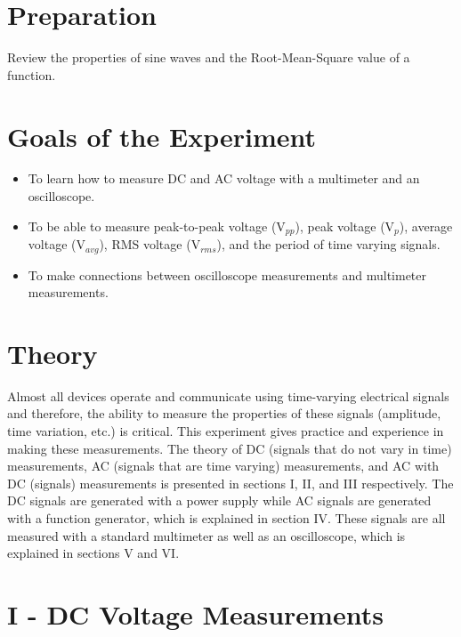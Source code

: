 \section{{\bf Preparation}}
Review the properties of sine waves and the Root-Mean-Square value of a function.

\section{{\bf Goals of the Experiment}}
\begin{itemize}
    \item To learn how to measure DC and AC voltage with a multimeter and an oscilloscope.
    \item To be able to measure peak-to-peak voltage (V$_{pp}$), peak voltage (V$_p$), average voltage (V$_{avg}$), RMS voltage (V$_{rms}$), and the period of time varying signals.
    \item To make connections between oscilloscope measurements and multimeter measurements.
\end{itemize}

\section{{\bf Theory}}
Almost all devices operate and communicate using time-varying electrical signals and therefore, the ability to measure the properties of these signals (amplitude, time variation, etc.) is critical. This experiment gives practice and experience in making these measurements. The theory of DC (signals that do not vary in time) measurements, AC (signals that are time varying) measurements, and AC with DC (signals) measurements is presented in sections I, II, and III respectively. The DC signals are generated with a power supply while AC signals are generated with a function generator, which is explained in section IV. These signals are all measured with a standard multimeter as well as an oscilloscope, which is explained in sections V and VI.

\section{{\bf I - DC Voltage Measurements}}


